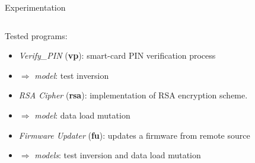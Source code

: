 \begin{frame}[fragile]{Experimentation}
\vfill
{\tiny
    \begin{columns}    
        \begin{column}{0.5\textwidth}
            Tested programs:
            \begin{itemize}
                \item \textit{Verify\_PIN} (\textbf{vp}): smart-card PIN verification process
                \item[] $\Rightarrow$ \textit{model}: test inversion
                \item \textit{RSA Cipher} (\textbf{rsa}): implementation of RSA encryption scheme. 
                \item[] $\Rightarrow$ \textit{model}: data load mutation
                \item \textit{Firmware Updater} (\textbf{fu}): updates a firmware from remote source
                \item[] $\Rightarrow$ \textit{models}: test inversion and data load mutation
            \end{itemize}
        \end{column}
        \begin{column}{0.5\textwidth}
        \end{column}
    \end{columns}

    \vspace{0.2cm}
    
}
\end{frame}

